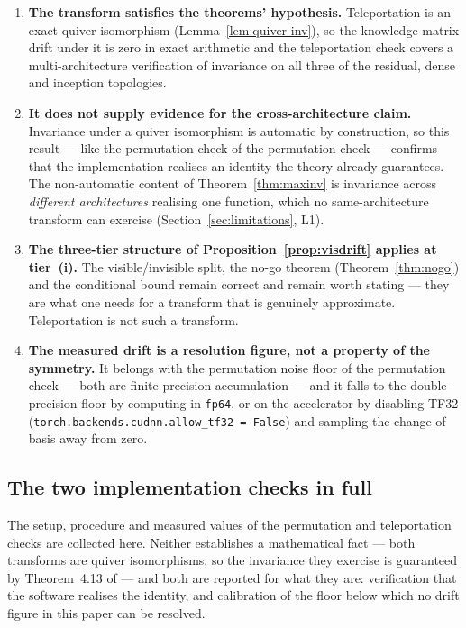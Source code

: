 \begin{enumerate}
\item \textbf{The transform satisfies the theorems' hypothesis.} Teleportation is
an exact quiver isomorphism (Lemma~\ref{lem:quiver-inv}), so the knowledge-matrix
drift under it is zero in exact arithmetic and the teleportation check covers a multi-architecture
verification of invariance on all three of the residual, dense and inception
topologies.

\item \textbf{It does not supply evidence for the cross-architecture claim.}
Invariance under a quiver isomorphism is automatic by construction, so this
result --- like the permutation check of the permutation check --- confirms that the
implementation realises an identity the theory already guarantees. The
non-automatic content of Theorem~\ref{thm:maxinv} is invariance across
\emph{different architectures} realising one function, which no
same-architecture transform can exercise (Section~\ref{sec:limitations}, L1).

\item \textbf{The three-tier structure of Proposition~\ref{prop:visdrift} applies
at tier~(i).} The visible/invisible split, the no-go theorem
(Theorem~\ref{thm:nogo}) and the conditional bound remain correct and remain
worth stating --- they are what one needs for a transform that is genuinely
approximate. Teleportation is not such a transform.

\item \textbf{The measured drift is a resolution figure, not a property of the
symmetry.} It belongs with the permutation noise floor of the permutation check --- both are
finite-precision accumulation --- and it falls to the double-precision floor by
computing in \texttt{fp64}, or on the accelerator by disabling TF32
(\texttt{torch.backends.cudnn.allow\_tf32 = False}) and sampling the change of
basis away from zero.
\end{enumerate}

\subsection{The two implementation checks in full}
\label{app:teleport-checks}

The setup, procedure and measured values of the permutation and teleportation
checks are collected here. Neither establishes a mathematical fact --- both
transforms are quiver isomorphisms, so the invariance they exercise is
guaranteed by Theorem~4.13 of \citet{armenta2021representation} --- and both are
reported for what they are: verification that the software realises the identity,
and calibration of the floor below which no drift figure in this paper can be
resolved.

